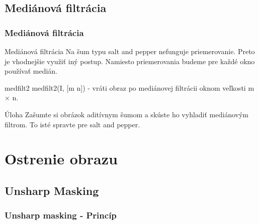 \documentclass{beamer}
\begin{document}
\subsection{Mediánová filtrácia}
\begin{frame}
\frametitle{Mediánová filtrácia}
\begin{block}{Mediánová filtrácia}
Na šum typu salt and pepper nefunguje priemerovanie. Preto je vhodnejšie využiť iný postup. Namiesto priemerovania budeme pre každé okno používať medián.
\end{block}

\begin{block}{medfilt2}
medfilt2(I, [m n]) - vráti obraz po mediánovej filtrácii oknom veľkosti m $\times$ n.
\end{block}

\begin{block}{Úloha}
Zašumte si obrázok aditívnym šumom a skúste ho vyhladiť mediánovým filtrom. To isté spravte pre salt and pepper.
\end{block}
\end{frame}

\section{Ostrenie obrazu}
\subsection{Unsharp Masking}

\begin{frame}
\frametitle{Unsharp masking - Princíp} 
\noindent{}
\end{frame}
\end{document}
